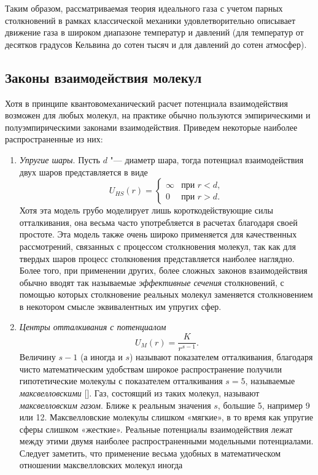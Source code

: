 Таким образом, рассматриваемая теория идеального газа с учетом парных столкновений в рамках классической механики
удовлетворительно описывает движение газа в широком диапазоне температур и давлений
(для температур от десятков градусов Кельвина до сотен тысяч и для давлений до сотен атмосфер).

\subsection{Законы взаимодействия молекул}
Хотя в принципе квантовомеханический расчет потенциала взаимодействия возможен для любых молекул,
на практике обычно пользуются эмпирическими и полуэмпирическими законами взаимодействия.
Приведем некоторые наиболее распространенные из них:
\begin{enumerate}
    \item \textit{Упругие шары}.
Пусть \(d\) "--- диаметр шара, тогда потенциал взаимодействия двух шаров представляется в виде
\[U_{HS}(r) = \begin{cases}
	\infty	& \text{при } r < d, \\
	0		& \text{при } r > d.
\end{cases}\]
Хотя эта модель грубо моделирует лишь короткодействующие силы отталкивания,
она весьма часто употребляется в расчетах благодаря своей простоте.
Эта модель также очень широко применяется для качественных рассмотрений,
связанных с процессом столкновения молекул,
так как для твердых шаров процесс столкновения представляется наиболее наглядно.
Более того, при применении других, более сложных законов взаимодействия обычно вводят так называемые
\textit{эффективные сечения} столкновений, с помощью которых столкновение реальных молекул заменяется
столкновением в некотором смысле эквивалентных им упругих сфер.
	\item \textit{Центры отталкивания с потенциалом} \[U_M(r) = \frac{K}{r^{s-1}}.\]
Величину \(s-1\) (а иногда и \(s\)) называют показателем отталкивания,
благодаря чисто математическим удобствам широкое распространение получили гипотетические
молекулы с показателем отталкивания \(s=5\), называемые \textit{максвелловскими} [].
Газ, состоящий из таких молекул, называют \textit{максвелловским газом}.
Ближе к реальным значения \(s\), большие 5, например 9 или 12.
Максвелловские молекулы слишком «мягкие», в то время как упругие сферы слишком «жесткие».
Реальные потенциалы взаимодействия лежат между этими двумя наиболее распространенными модельными потенциалами.
Следует заметить, что применение весьма удобных в математическом отношении максвелловских молекул иногда

\end{enumerate}

